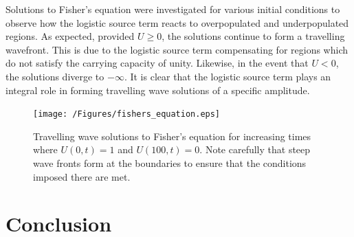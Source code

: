 \documentclass[11pt,titlepage,a4paper]{article}
\begin{document}
		Solutions to Fisher's equation were investigated for various initial conditions to observe how the logistic source term reacts to overpopulated and underpopulated regions. As expected, provided $U \ge 0$, the solutions continue to form a travelling wavefront. This is due to the logistic source term compensating for regions which do not satisfy the carrying capacity of unity. Likewise, in the event that $U < 0$, the solutions diverge to $-\infty$. It is clear that the logistic source term plays an integral role in forming travelling wave solutions of a specific amplitude.

		\begin{figure}[tbh]
			\centering
				\texttt{[image: /Figures/fishers\_equation.eps]}
			\caption{Travelling wave solutions to Fisher's equation for increasing times where $U(0, t) = 1$ and $U(100, t) = 0$. Note carefully that steep wave fronts form at the boundaries to ensure that the conditions imposed there are met.}
			\label{fig:fishers_equation_sol_pdepe}
		\end{figure}
	


\section{Conclusion}
	\label{sec:conclusion}
	
	



\clearpage
\printbibliography

\end{document}
